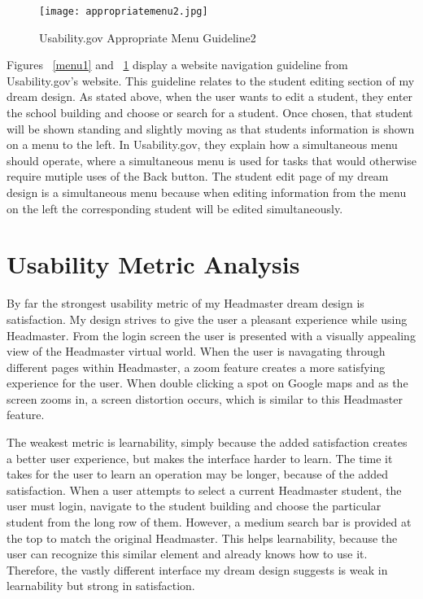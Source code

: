 \documentclass[11pt]{article}
\begin{document}
\begin{figure}[h]
\centering
\texttt{[image: appropriatemenu2.jpg]}
\caption{Usability.gov Appropriate Menu Guideline2}
\label{menu2}
\end{figure}

Figures  ~\ref{menu1} and ~\ref{menu2} display a website navigation guideline from Usability.gov's website. This guideline relates to the student editing section of my dream design. As stated above, when the user wants to edit a student, they enter the school building and choose or search for a student. Once chosen, that student will be shown standing and slightly moving as that students information is shown on a menu to the left. In Usability.gov, they explain how a simultaneous menu should operate, where a simultaneous menu is used for tasks that would otherwise require mutiple uses of the Back button. The student edit page of my dream design is a simultaneous menu because when editing information from the menu on the left the corresponding student will be edited simultaneously. 



\section{Usability Metric Analysis}
By far the strongest usability metric of my Headmaster dream design is satisfaction. My design strives to give the user a pleasant experience while using Headmaster. From the login screen the user is presented with a visually appealing view of the Headmaster virtual world. When the user is navagating through different pages within Headmaster, a zoom feature creates a more satisfying experience for the user. When double clicking a spot on Google maps and as the screen zooms in, a screen distortion occurs, which is similar to this Headmaster feature.

The weakest metric is learnability, simply because the added satisfaction creates a better user experience, but makes the interface harder to learn. The time it takes for the user to learn an operation may be longer, because of the added satisfaction. When a user attempts to select a current Headmaster student, the user must login, navigate to the student building and choose the particular student from the long row of them. However, a medium search bar is provided at the top to match the original Headmaster. This helps learnability, because the user can recognize this similar element and already knows how to use it. Therefore, the vastly different interface my dream design suggests is weak in learnability but strong in satisfaction.
\end{document}

